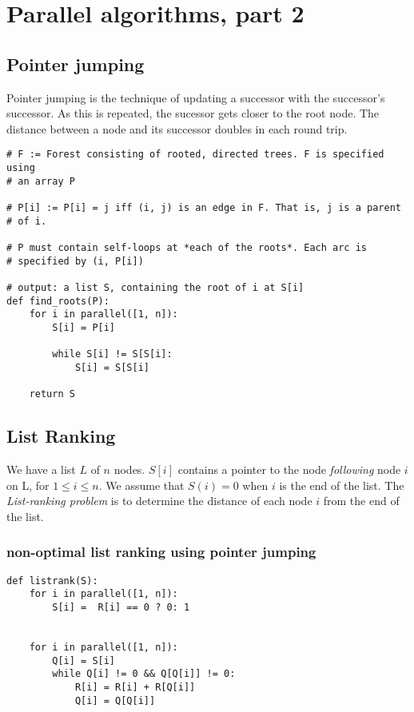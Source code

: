 \chapter{Parallel algorithms, part 2}

\section{Pointer jumping}
Pointer jumping is the technique of updating a successor with the
successor's successor. As this is repeated, the sucessor gets closer
to the root node. The distance between a node and its successor
doubles in each round trip.


\begin{verbatim}
# F := Forest consisting of rooted, directed trees. F is specified using
# an array P

# P[i] := P[i] = j iff (i, j) is an edge in F. That is, j is a parent
# of i.

# P must contain self-loops at *each of the roots*. Each arc is
# specified by (i, P[i])

# output: a list S, containing the root of i at S[i]
def find_roots(P):
    for i in parallel([1, n]):
        S[i] = P[i]

        while S[i] != S[S[i]:
            S[i] = S[S[i]

    return S

\end{verbatim}

\section{List Ranking}

We have a list $L$ of $n$ nodes. $S[i]$ contains a pointer to the
node \textit{following} node $i$ on L, for $1 \leq i \leq n$. We assume
that $S(i) = 0$ when $i$ is the end of the list. The \textit{List-ranking problem}
is to determine the distance of each node $i$ from the end of the list.

\subsection{\textbf{non-optimal} list ranking using pointer jumping}

\begin{verbatim}
def listrank(S):
    for i in parallel([1, n]):
        S[i] =  R[i] == 0 ? 0: 1


    for i in parallel([1, n]):
        Q[i] = S[i]
        while Q[i] != 0 && Q[Q[i]] != 0:
            R[i] = R[i] + R[Q[i]]
            Q[i] = Q[Q[i]]
\end{verbatim}

